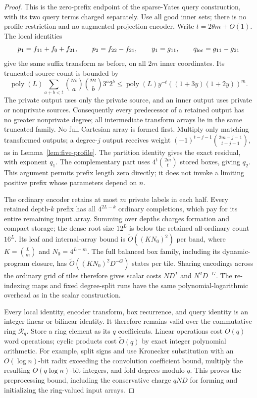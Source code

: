 \documentclass[11pt]{article}
\newcommand{\softO}{\widetilde O}
\begin{document}
\begin{proof}
This is the zero-prefix endpoint of the sparse-Yates query construction,
with its two query terms charged separately. Use all good inner sets;
there is no profile restriction and no augmented projection encoder.
Write $t=2\theta m+O(1)$. The local identities
\[
 p_1=f_{11}+f_0+f_{21},\qquad p_2=f_{22}-f_{21},\qquad
 y_1=g_{11},\qquad q_{\rm loc}=g_{11}-g_{21}
\]
give the same suffix transform as before, on all $2m$ inner coordinates.
Its truncated source count is bounded by
\[
 \operatorname{poly}(L)\sum_{a+b<t}\binom ma\binom mb3^a2^b
 \le \operatorname{poly}(L)y^{-t}((1+3y)(1+2y))^m.
\]
The private output uses only the private source, and an inner output uses
private or nonprivate sources. Consequently every predecessor of a
retained output has no greater nonprivate degree; all intermediate
transform arrays lie in the same truncated family. No full Cartesian
array is formed first. Multiply only matching transformed outputs; a degree-$j$ output receives
weight $(-1)^{t-j-1}\binom{2m-j-1}{t-j-1}$, as in
Lemma~\ref{lem:five-profile}. The partition identity gives the exact
residual, with exponent $q_1$.
The complementary part uses $4^t\binom{2m}{t}$ stored boxes, giving
$q_2$. This argument permits prefix length zero directly; it does not
invoke a limiting positive prefix whose parameters depend on $n$.

The ordinary encoder retains at most $m$ private labels in each half.
Every retained depth-$k$ prefix has all $4^{2L-k}$ ordinary completions,
which pay for its entire remaining input array. Summing over depths
charges formation and compact storage; the dense root size $12^L$ is
below the retained all-ordinary count $16^L$. Its leaf and internal-array bound is
$\softO((KN_0)^2)$ per band, where $K=\binom Lm$ and $N_0=4^{L-m}$.
The full balanced box family, including its dynamic-program closure,
has $\softO((KN_0)^2D^{-G})$ states per tile. Sharing encodings across
the ordinary grid of tiles therefore gives scalar costs $ND^T$ and
$N^2D^{-G}$. The re-indexing maps and fixed degree-split runs have the
same polynomial-logarithmic overhead as in the scalar construction.

Every local identity, encoder transform, box recurrence, and query
identity is an integer linear or bilinear identity. It therefore remains
valid over the commutative ring $\mathcal R_q$. Store a ring element as
its $q$ coefficients. Linear operations cost $O(q)$ word operations;
cyclic products cost $\softO(q)$ by exact integer polynomial arithmetic.
For example, split signs and use Kronecker substitution with an
$O(\log n)$-bit radix exceeding the convolution coefficient bound,
multiply the resulting $O(q\log n)$-bit integers, and fold degrees
modulo $q$.
This proves the preprocessing bound, including the conservative charge
$qND$ for forming and initializing the ring-valued input arrays.


\end{proof}
\end{document}
